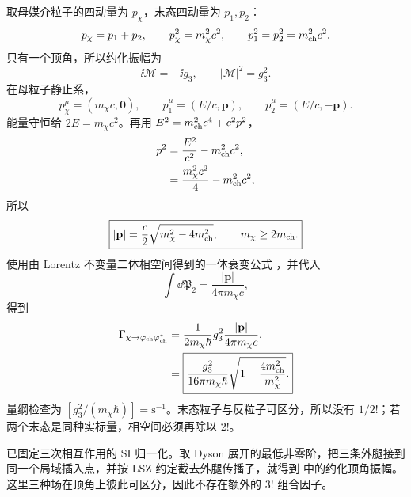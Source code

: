 \begin{exbox}
取母媒介粒子的四动量为 $p_\chi$，末态四动量为 $p_1,p_2$：
\begin{equation*}
 p_\chi=p_1+p_2,\qquad p_\chi^2=m_\chi^2c^2,\qquad p_1^2=p_2^2=m_{\rm ch}^2c^2.
\end{equation*}
只有一个顶角，所以约化振幅为
\begin{equation}
 \ii\mathcal M=-\ii g_3,
 \qquad |\mathcal M|^2=g_3^2.
 \label{eq:scalar-cubic-decay-mphi-r15}
\end{equation}
在母粒子静止系，
\begin{equation*}
 p_\chi^\mu=(m_\chi c,\mathbf0),\qquad
 p_1^\mu=(E/c,\mathbf p),\qquad
 p_2^\mu=(E/c,-\mathbf p).
\end{equation*}
能量守恒给 $2E=m_\chi c^2$。再用 $E^2=m_{\rm ch}^2c^4+c^2p^2$，
\begin{align*}
 p^2
 &=\frac{E^2}{c^2}-m_{\rm ch}^2c^2,\\
 &=\frac{m_\chi^2c^2}{4}-m_{\rm ch}^2c^2,
\end{align*}
所以
\begin{equation}
 \boxed{
 |\mathbf p|
 =\frac{c}{2}\sqrt{m_\chi^2-4m_{\rm ch}^2},
 \qquad m_\chi\ge 2m_{\rm ch}.}
 \label{eq:scalar-cubic-decay-p-r10}
\end{equation}
使用由 Lorentz 不变量二体相空间得到的一体衰变公式 ，并代入
\begin{equation*}
 \int\dd\mathfrak P_2
 =\frac{|\mathbf p|}{4\pi m_\chi c},
\end{equation*}
得到
\begin{align}
 \Gamma_{\chi\to\varphi_{\rm ch}\varphi_{\rm ch}^{\ast}}
 &=\frac{1}{2m_\chi\hbar}g_3^2
 \frac{|\mathbf p|}{4\pi m_\chi c},\\
 &=\boxed{
 \frac{g_3^2}{16\pi m_\chi\hbar}
 \sqrt{1-\frac{4m_{\rm ch}^2}{m_\chi^2}}.}
 \label{eq:scalar-cubic-decay-width-r10}
\end{align}
量纲检查为 $[g_3^2/(m_\chi\hbar)]=\mathrm{s^{-1}}$。末态粒子与反粒子可区分，所以没有 $1/2!$；若两个末态是同种实标量，相空间必须再除以 $2!$。

\medskip

 已固定三次相互作用的 SI 归一化。取 Dyson 展开的最低非零阶，把三条外腿接到同一个局域插入点，并按 LSZ 约定截去外腿传播子，就得到 中的约化顶角振幅。这里三种场在顶角上彼此可区分，因此不存在额外的 $3!$ 组合因子。


\end{exbox}
